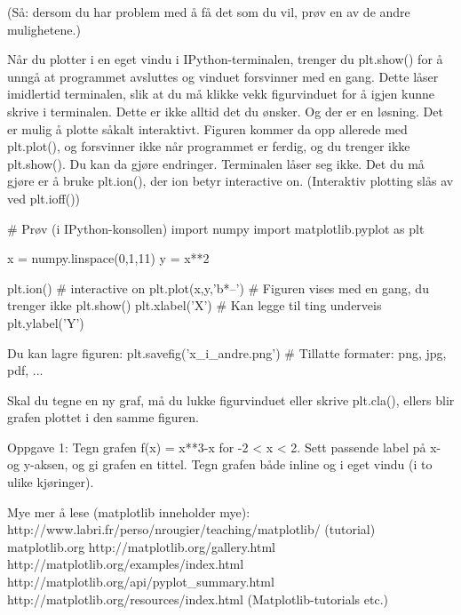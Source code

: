 (Så: dersom du har problem med å få det som du vil, prøv en av de andre mulighetene.) 



Når du plotter i en eget vindu i IPython-terminalen, trenger du plt.show() 
for å unngå at programmet avsluttes og vinduet forsvinner med en gang. 
Dette låser imidlertid terminalen, slik at du må klikke vekk figurvinduet 
for å igjen kunne skrive i terminalen. 
Dette er ikke alltid det du ønsker. 
Og der er en løsning. 
Det er mulig å plotte såkalt interaktivt. 
Figuren kommer da opp allerede med plt.plot(), og forsvinner ikke når programmet er ferdig, 
og du trenger ikke plt.show(). 
Du kan da gjøre endringer. Terminalen låser seg ikke. 
Det du må gjøre er å bruke plt.ion(), der ion betyr interactive on. 
(Interaktiv plotting slås av ved plt.ioff()) 


# Prøv (i IPython-konsollen)
import numpy 
import matplotlib.pyplot as plt 

x = numpy.linspace(0,1,11)
y = x**2

plt.ion()              # interactive on 
plt.plot(x,y,'b*--')   # Figuren vises med en gang, du trenger ikke plt.show()
plt.xlabel('X')        # Kan legge til ting underveis
plt.ylabel('Y') 

Du kan lagre figuren: 
plt.savefig('x_i_andre.png')   # Tillatte formater: png, jpg, pdf, ... 


Skal du tegne en ny graf, må du lukke figurvinduet eller skrive plt.cla(), 
ellers blir grafen plottet i den samme figuren. 



Oppgave 1: Tegn grafen f(x) = x**3-x for -2 < x < 2. 
Sett passende label på x- og y-aksen, og gi grafen en tittel.
Tegn grafen både inline og i eget vindu (i to ulike kjøringer). 



Mye mer å lese (matplotlib inneholder mye): 
http://www.labri.fr/perso/nrougier/teaching/matplotlib/  (tutorial) 
matplotlib.org
http://matplotlib.org/gallery.html 
http://matplotlib.org/examples/index.html
http://matplotlib.org/api/pyplot_summary.html
http://matplotlib.org/resources/index.html  (Matplotlib-tutorials etc.)
